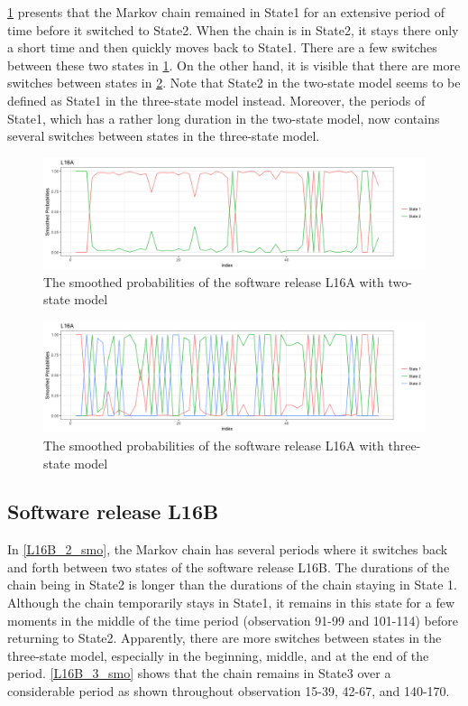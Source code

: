 \ref{L16A_2_smo} presents that the Markov chain remained in State1
for an extensive period of time before it switched to State2. When
the chain is in State2, it stays there only a short time and then
quickly moves back to State1. There are a few switches between these
two states in \ref{L16A_2_smo}. On the other hand, it is visible
that there are more switches between states in \ref{L16A_3_smo}.
Note that State2 in the two-state model seems to be defined as State1
in the three-state model instead. Moreover, the periods of State1,
which has a rather long duration in the two-state model, now contains
several switches between states in the three-state model.

\begin{figure}[H]
\centering{}\includegraphics[scale=0.35]{picture/L16A_2_smo1}\caption{The smoothed probabilities of the software release L16A with two-state
model}
\label{L16A_2_smo}
\end{figure}

\begin{figure}[H]
\centering{}\includegraphics[scale=0.35]{picture/L16A_3_smo1}\caption{The smoothed probabilities of the software release L16A with three-state
model}
\label{L16A_3_smo}
\end{figure}


\subsection{Software release L16B}

In \ref{L16B_2_smo}, the Markov chain has several periods where it
switches back and forth between two states of the software release
L16B. The durations of the chain being in State2 is longer than the
durations of the chain staying in State 1. Although the chain temporarily
stays in State1, it remains in this state for a few moments in the
middle of the time period (observation 91-99 and 101-114) before returning
to State2. Apparently, there are more switches between states in the
three-state model, especially in the beginning, middle, and at the
end of the period. \ref{L16B_3_smo} shows that the chain remains
in State3 over a considerable period as shown throughout observation
15-39, 42-67, and 140-170.

